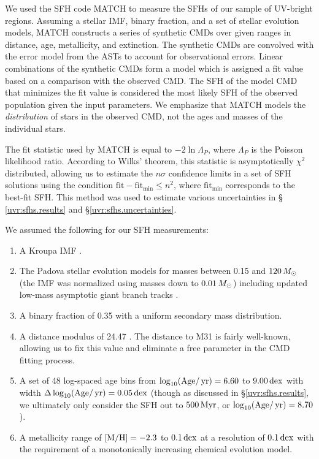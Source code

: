 We used the SFH code MATCH \citep{Dolphin:2002} to measure the SFHs of our sample
of UV-bright regions. Assuming a stellar IMF, binary fraction, and a set of
stellar evolution models, MATCH constructs a series of synthetic CMDs over
given ranges in distance, age, metallicity, and extinction. The synthetic CMDs
are convolved with the error model from the ASTs to account for observational
errors. Linear combinations of the synthetic CMDs form a model which is
assigned a fit value based on a comparison with the observed CMD. The SFH of
the model CMD that minimizes the fit value is considered the most likely SFH of
the observed population given the input parameters. We emphasize that MATCH
models the \emph{distribution} of stars in the observed CMD, not the ages and
masses of the individual stars.

The fit statistic used by MATCH is equal to $-2 \ln \Lambda_P$, where
$\Lambda_P$ is the Poisson likelihood ratio. According to Wilks' theorem, this
statistic is asymptotically $\chi^2$ distributed, allowing us to estimate the
$n\sigma$ confidence limits in a set of SFH solutions using the condition
$\mathrm{fit-fit_{min}} \le n^2$, where $\mathrm{fit_{min}}$ corresponds to the
best-fit SFH. This method was used to estimate various uncertainties in \S
\ref{uvr:sfhs.results} and \S \ref{uvr:sfhs.uncertainties}.

We assumed the following for our SFH measurements:
\begin{enumerate}
\item A Kroupa IMF \citep{Kroupa:2001}.
\item The Padova stellar evolution models for masses between 0.15 and
    $120\,M_\odot$ (the IMF was normalized using masses down to
    $0.01\,M_\odot$) including updated low-mass asymptotic giant branch tracks
    \citep{Girardi:2010}.
\item A binary fraction of 0.35 with a uniform secondary mass distribution.
\item A distance modulus of 24.47 \citep{McConnachie:2005}. The distance to M31 is
    fairly well-known, allowing us to fix this value and eliminate a free
    parameter in the CMD fitting process.
\item A set of 48 log-spaced age bins from $\log_{10}(\mathrm{Age}/\,\mathrm{yr}) = 6.60$
    to $9.00\,\mathrm{dex}$ with width $\Delta \log_{10}(\mathrm{Age}/\,\mathrm{yr}) =
    0.05\,\mathrm{dex}$ (though as discussed in \S \ref{uvr:sfhs.results}, we
    ultimately only consider the SFH out to $500\,\mathrm{Myr}$, or
    $\log_{10}(\mathrm{Age}/\,\mathrm{yr}) = 8.70$).
\item A metallicity range of $\mathrm{[M/H]} = -2.3$ to $0.1\,\mathrm{dex}$ at
    a resolution of $0.1\,\mathrm{dex}$ with the requirement of a monotonically
    increasing chemical evolution model.
\end{enumerate}

